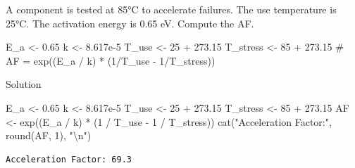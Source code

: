 \documentclass[
  letterpaper,
  DIV=11,
  numbers=noendperiod]{scrreprt}
\newenvironment{Shaded}{\begin{snugshade}}{\end{snugshade}}
\newcommand{\CommentTok}[1]{\textcolor[rgb]{0.37,0.37,0.37}{#1}}
\newcommand{\DecValTok}[1]{\textcolor[rgb]{0.68,0.00,0.00}{#1}}
\newcommand{\FloatTok}[1]{\textcolor[rgb]{0.68,0.00,0.00}{#1}}
\newcommand{\FunctionTok}[1]{\textcolor[rgb]{0.28,0.35,0.67}{#1}}
\newcommand{\NormalTok}[1]{\textcolor[rgb]{0.00,0.23,0.31}{#1}}
\newcommand{\OtherTok}[1]{\textcolor[rgb]{0.00,0.23,0.31}{#1}}
\newcommand{\SpecialCharTok}[1]{\textcolor[rgb]{0.37,0.37,0.37}{#1}}
\newcommand{\StringTok}[1]{\textcolor[rgb]{0.13,0.47,0.30}{#1}}
\begin{document}
\begin{tcolorbox}[enhanced jigsaw, arc=.35mm, bottomrule=.15mm, bottomtitle=1mm, breakable, colback=white, colbacktitle=quarto-callout-note-color!10!white, colframe=quarto-callout-note-color-frame, coltitle=black, left=2mm, leftrule=.75mm, opacityback=0, opacitybacktitle=0.6, rightrule=.15mm, title=\textcolor{quarto-callout-note-color}{\faInfo}\hspace{0.5em}{Try It}, titlerule=0mm, toprule=.15mm, toptitle=1mm]

A component is tested at 85°C to accelerate failures. The use
temperature is 25°C. The activation energy is 0.65 eV. Compute the AF.

\begin{Shaded}
\begin{Highlighting}[]
\NormalTok{E\_a      }\OtherTok{\textless{}{-}} \FloatTok{0.65}
\NormalTok{k        }\OtherTok{\textless{}{-}} \FloatTok{8.617e{-}5}
\NormalTok{T\_use    }\OtherTok{\textless{}{-}} \DecValTok{25} \SpecialCharTok{+} \FloatTok{273.15}
\NormalTok{T\_stress }\OtherTok{\textless{}{-}} \DecValTok{85} \SpecialCharTok{+} \FloatTok{273.15}
\CommentTok{\# AF = exp((E\_a / k) * (1/T\_use {-} 1/T\_stress))}
\end{Highlighting}
\end{Shaded}

Solution

\begin{Shaded}
\begin{Highlighting}[]
\NormalTok{E\_a      }\OtherTok{\textless{}{-}} \FloatTok{0.65}
\NormalTok{k        }\OtherTok{\textless{}{-}} \FloatTok{8.617e{-}5}
\NormalTok{T\_use    }\OtherTok{\textless{}{-}} \DecValTok{25} \SpecialCharTok{+} \FloatTok{273.15}
\NormalTok{T\_stress }\OtherTok{\textless{}{-}} \DecValTok{85} \SpecialCharTok{+} \FloatTok{273.15}
\NormalTok{AF }\OtherTok{\textless{}{-}} \FunctionTok{exp}\NormalTok{((E\_a }\SpecialCharTok{/}\NormalTok{ k) }\SpecialCharTok{*}\NormalTok{ (}\DecValTok{1} \SpecialCharTok{/}\NormalTok{ T\_use }\SpecialCharTok{{-}} \DecValTok{1} \SpecialCharTok{/}\NormalTok{ T\_stress))}
\FunctionTok{cat}\NormalTok{(}\StringTok{"Acceleration Factor:"}\NormalTok{, }\FunctionTok{round}\NormalTok{(AF, }\DecValTok{1}\NormalTok{), }\StringTok{"}\SpecialCharTok{\textbackslash{}n}\StringTok{"}\NormalTok{)}
\end{Highlighting}
\end{Shaded}

\begin{verbatim}
Acceleration Factor: 69.3 
\end{verbatim}

\end{tcolorbox}
\end{document}
